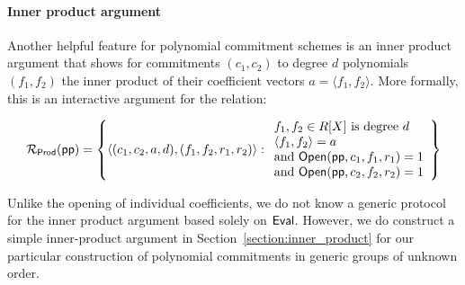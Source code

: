 \documentclass{article}
\theoremstyle{definition}
\begin{document}

 

\paragraph{Inner product argument} Another helpful feature for polynomial commitment schemes is an inner product argument that shows for commitments $(c_1, c_2)$ to degree $d$ polynomials $(f_1, f_2)$ the inner product of their coefficient vectors $a = \langle f_1, f_2 \rangle$. More formally, this is an interactive argument for the relation: 

\[ 
\mathcal{R_\textsf{Prod}}(\textsf{pp}) = \left\{
\langle (c_1, c_2, a, d), (f_1, f_2, r_1, r_2) \rangle
: 
\begin{array}{l} 
f_1, f_2 \in R[X] \ \text{is degree} \ d \ \\
\langle f_1, f_2 \rangle = a \\ 
 \text{and} \ \textsf{{Open}}(\textsf{pp}, c_1, f_1, r_1) = 1 \\
 \text{and} \ \textsf{{Open}}(\textsf{pp}, c_2, f_2, r_2) = 1
\end{array}
\right\}
\] 

Unlike the opening of individual coefficients, we do not know a generic protocol for the inner product argument based solely on $\textsf{{Eval}}$. However, we do construct a simple inner-product argument in Section~\ref{section:inner_product} for our particular construction of polynomial commitments in generic groups of unknown order.  

\end{document}
